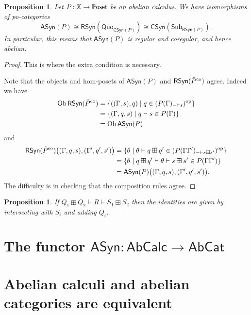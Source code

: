\documentclass[11pt, oneside, article]{memoir}
\theoremstyle{plain}
\newtheorem{proposition}[theorem]{Proposition}
\theoremstyle{definition}
\theoremstyle{remark}
\newcommand{\Set}[1]{\mathrm{#1}}%
\newcommand{\Cat}[1]{{\mathsf{#1}}}%
\newcommand{\CCat}[1]{\mathbb{\StrLeft{#1}{1}}\Cat{\StrGobbleLeft{#1}{1}}}%
\newcommand{\Funr}[1]{\mathsf{#1}}%
\DeclareMathOperator{\ob}{\Set{Ob}}
\newcommand{\tn}[1]{\textnormal{#1}}
\newcommand{\op}{^{\tn{op}}}
\newcommand{\co}{^{\tn{co}}}
\newcommand{\xx}{\mathbb{X}}
\newcommand{\abcat}{\Cat{AbCat}}
\newcommand{\abcalc}{\Cat{AbCalc}}
\newcommand{\sub}{\Funr{Sub}}
\newcommand{\quo}{\Funr{Quo}}
\newcommand{\syn}{\Funr{ASyn}}
\newcommand{\rsyn}{\Funr{RSyn}}
\newcommand{\csyn}{\Funr{CSyn}}
\newcommand{\abc}{P} %
\newcommand{\newcalc}[1]{\hat{#1}}
\newcommand{\pposet}{\CCat{Poset}}
\begin{document}
\begin{proposition}
	Let $\abc\colon \xx \to \pposet$ be an abelian calculus. We have isomorphisms of po-categories
	\[
		\syn(\abc) \cong \rsyn(\quo_{\csyn(\abc)}) \cong \csyn(\sub_{\rsyn(\abc)}).
  \]
  In particular, this means that $\syn(\abc)$ is regular and coregular, and hence abelian.
\end{proposition}
\begin{proof}
  This is where the extra condition is necessary.
  
  Note that the objects and hom-posets of $\syn(\abc)$ and $\rsyn(\newcalc{\abc}\co)$ agree. Indeed we have
  \begin{align*}
    \ob\rsyn(\newcalc{\abc}\co) &= \{((\Gamma,s),q) \mid q \in (P(\Gamma)_{-\vdash s})\op \} \\
    &= \{(\Gamma,q,s) \mid q \vdash s \in P(\Gamma)\} \\
    &=\ob\syn(\abc)
  \end{align*}
  and
  \begin{align*}
    \rsyn(\newcalc{\abc}\co)\big((\Gamma,q,s),(\Gamma',q',s')\big) 
    &= \{\theta \mid \theta \vdash q\boxplus q' \in (P(\Gamma\Gamma')_{-\vdash s\boxplus s'})\op \} \\
    &= \{\theta \mid q\boxplus q' \vdash \theta \vdash s\boxplus s' \in P(\Gamma\Gamma')\} \\
    &=\syn(\abc)\big((\Gamma,q,s),(\Gamma',q',s')\big).
  \end{align*}
  The difficulty is in checking that the composition rules agree.

\end{proof}

\begin{proposition}
If $Q_1\boxplus Q_2\vdash R\vdash S_1\boxplus S_2$ then the identities are given by intersecting with $S_i$ and adding $Q_i$.
\end{proposition}

\chapter{The functor $\syn\colon \abcalc \to \abcat$}

\chapter{Abelian calculi and abelian categories are equivalent}

\printbibliography
\end{document}
